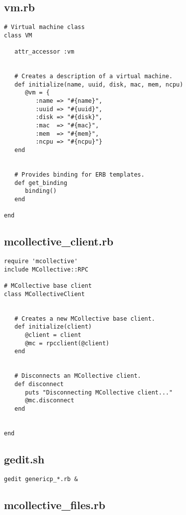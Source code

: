 \subsection{vm.rb}


\begin{lstlisting}
# Virtual machine class
class VM

   attr_accessor :vm
   
   
   # Creates a description of a virtual machine.
   def initialize(name, uuid, disk, mac, mem, ncpu)
      @vm = {
         :name => "#{name}",
         :uuid => "#{uuid}",
         :disk => "#{disk}",
         :mac  => "#{mac}",
         :mem  => "#{mem}",
         :ncpu => "#{ncpu}"}
   end
   
   
   # Provides binding for ERB templates.
   def get_binding
      binding()
   end
   
end
\end{lstlisting}


\subsection{mcollective\_client.rb}


\begin{lstlisting}
require 'mcollective'
include MCollective::RPC

# MCollective base client
class MCollectiveClient
   
   
   # Creates a new MCollective base client.
   def initialize(client)
      @client = client
      @mc = rpcclient(@client)
   end
   
   
   # Disconnects an MCollective client.
   def disconnect
      puts "Disconnecting MCollective client..."
      @mc.disconnect
   end
   
   
end
\end{lstlisting}


\subsection{gedit.sh}


\begin{lstlisting}
gedit genericp_*.rb &
\end{lstlisting}


\subsection{mcollective\_files.rb}


